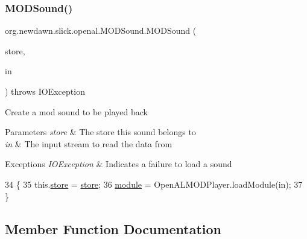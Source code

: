 \subsubsection{\texorpdfstring{M\+O\+D\+Sound()}{MODSound()}}
{\footnotesize\ttfamily org.\+newdawn.\+slick.\+openal.\+M\+O\+D\+Sound.\+M\+O\+D\+Sound (\begin{DoxyParamCaption}\item[{\mbox{\hyperlink{classorg_1_1newdawn_1_1slick_1_1openal_1_1_sound_store}{Sound\+Store}}}]{store,  }\item[{Input\+Stream}]{in }\end{DoxyParamCaption}) throws I\+O\+Exception\hspace{0.3cm}{\ttfamily [inline]}}

Create a mod sound to be played back


\begin{DoxyParams}{Parameters}
{\em store} & The store this sound belongs to \\
\hline
{\em in} & The input stream to read the data from \\
\hline
\end{DoxyParams}

\begin{DoxyExceptions}{Exceptions}
{\em I\+O\+Exception} & Indicates a failure to load a sound \\
\hline
\end{DoxyExceptions}

\begin{DoxyCode}
34                                                                          \{
35         this.\mbox{\hyperlink{classorg_1_1newdawn_1_1slick_1_1openal_1_1_m_o_d_sound_a36ab5f890c0566a6f9b1797fa91fdc7e}{store}} = \mbox{\hyperlink{classorg_1_1newdawn_1_1slick_1_1openal_1_1_m_o_d_sound_a36ab5f890c0566a6f9b1797fa91fdc7e}{store}};
36         \mbox{\hyperlink{classorg_1_1newdawn_1_1slick_1_1openal_1_1_m_o_d_sound_a5ff6f055cad7b57fc73f7a13fe80fee4}{module}} = OpenALMODPlayer.loadModule(in);
37     \}
\end{DoxyCode}


\subsection{Member Function Documentation}
\mbox{\label{classorg_1_1newdawn_1_1slick_1_1openal_1_1_m_o_d_sound_a50fa0b6d6dcf64018864606f27718ccd}} 
